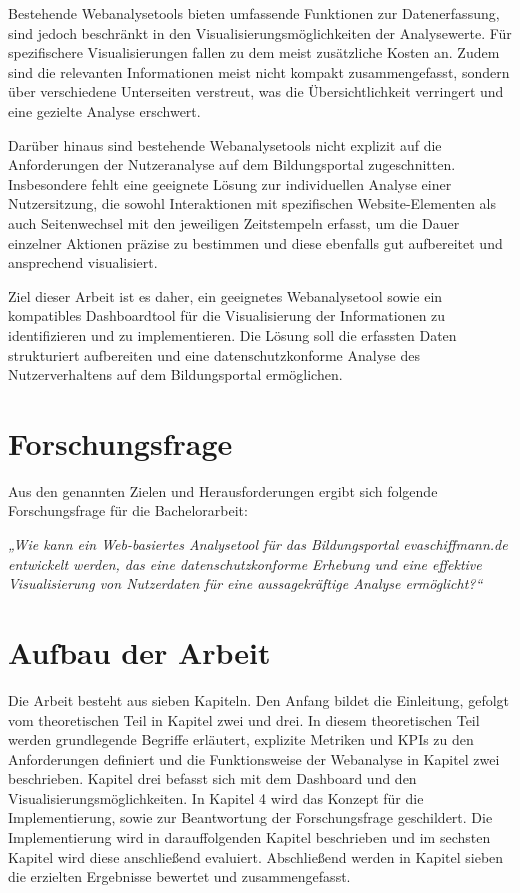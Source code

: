 Bestehende Webanalysetools bieten umfassende Funktionen zur Datenerfassung, sind jedoch beschränkt in den Visualisierungsmöglichkeiten der Analysewerte. Für spezifischere Visualisierungen fallen zu dem meist zusätzliche Kosten an. Zudem sind die relevanten Informationen meist nicht kompakt zusammengefasst, sondern über verschiedene Unterseiten verstreut, was die Übersichtlichkeit verringert und eine gezielte Analyse erschwert.

Darüber hinaus sind bestehende Webanalysetools nicht explizit auf die Anforderungen der Nutzeranalyse auf dem Bildungsportal zugeschnitten. Insbesondere fehlt eine geeignete Lösung zur individuellen Analyse einer Nutzersitzung, die sowohl Interaktionen mit spezifischen Website-Elementen als auch Seitenwechsel mit den jeweiligen Zeitstempeln erfasst, um die Dauer einzelner Aktionen präzise zu bestimmen und diese ebenfalls gut aufbereitet und ansprechend visualisiert.

Ziel dieser Arbeit ist es daher, ein geeignetes Webanalysetool sowie ein kompatibles Dashboardtool für die Visualisierung der Informationen zu identifizieren und zu implementieren. Die Lösung soll die erfassten Daten strukturiert aufbereiten und eine datenschutzkonforme Analyse des Nutzerverhaltens auf dem Bildungsportal ermöglichen.

\section{Forschungsfrage}
\label{sec:forschungsfrage}
Aus den genannten Zielen und Herausforderungen ergibt sich folgende Forschungsfrage für die Bachelorarbeit:

\textit{„Wie kann ein Web-basiertes Analysetool für das Bildungsportal \textit{evaschiffmann.de} entwickelt werden, das eine datenschutzkonforme Erhebung und eine effektive Visualisierung von Nutzerdaten für eine aussagekräftige Analyse ermöglicht?“}

\section{Aufbau der Arbeit}
\label{sec:aufbau}
Die Arbeit besteht aus sieben Kapiteln. Den Anfang bildet die Einleitung, gefolgt vom theoretischen Teil in Kapitel zwei und drei. In diesem theoretischen Teil werden grundlegende Begriffe erläutert, explizite Metriken und KPIs zu den Anforderungen definiert und die Funktionsweise der Webanalyse in Kapitel zwei beschrieben. Kapitel drei befasst sich mit dem Dashboard und den Visualisierungsmöglichkeiten. In Kapitel 4 wird das Konzept für die Implementierung, sowie zur Beantwortung der Forschungsfrage geschildert. Die Implementierung wird in darauffolgenden Kapitel beschrieben und im sechsten Kapitel wird diese anschließend evaluiert. Abschließend werden in Kapitel sieben die erzielten Ergebnisse bewertet und zusammengefasst.